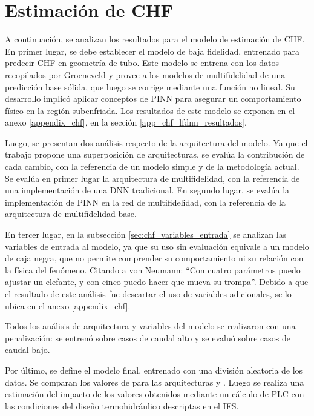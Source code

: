 \section{Estimación de CHF}
\label{sec:results_chf}

A continuación, se analizan los resultados para el modelo de estimación de CHF.
En primer lugar, se debe establecer el modelo de baja fidelidad, entrenado para predecir CHF en geometría de tubo. Este modelo se entrena con los datos recopilados por Groeneveld \citep{GROENEVELD2007, USNRC2019NUREGKM0011} y provee a los modelos de multifidelidad de una predicción base sólida, que luego se corrige mediante una función no lineal. Su desarrollo implicó aplicar conceptos de PINN para asegurar un comportamiento físico en la región subenfriada. Los resultados de este modelo se exponen en el anexo \ref{appendix_chf}, en la sección \ref{app_chf_lfdnn_resultados}. 

Luego, se presentan dos análisis respecto de la arquitectura del modelo. Ya que el trabajo propone una superposición de arquitecturas, se evalúa la contribución de cada cambio, con la referencia de un modelo simple y de la metodología actual. Se evalúa en primer lugar la arquitectura de multifidelidad, con la referencia de una implementación de una DNN tradicional. En segundo lugar, se evalúa la implementación de PINN en la red de multifidelidad, con la referencia de la arquitectura de multifidelidad base.

En tercer lugar, en la subsección \ref{sec:chf_variables_entrada} se analizan las variables de entrada al modelo, ya que su uso sin evaluación equivale a un modelo de caja negra, que no permite comprender su comportamiento ni su relación con la física del fenómeno. 
Citando a von Neumann: ``Con cuatro parámetros puedo ajustar un elefante, y con cinco puedo hacer que mueva su trompa''\footnotemark{}.
Debido a que el resultado de este análisis fue descartar el uso de variables adicionales, se lo ubica en el anexo \ref{appendix_chf}.

Todos los análisis de arquitectura y variables del modelo se realizaron con una penalización: se entrenó sobre casos de caudal alto y se evaluó sobre casos de caudal bajo.

Por último, se define el modelo final, entrenado con una división aleatoria de los datos. Se comparan los valores de \dnbrmin{} para las arquitecturas \mfdnn{} y \mfpinn{}. Luego se realiza una estimación del impacto de los valores obtenidos mediante un cálculo de PLC con las condiciones del diseño termohidráulico descriptas en el IFS.

